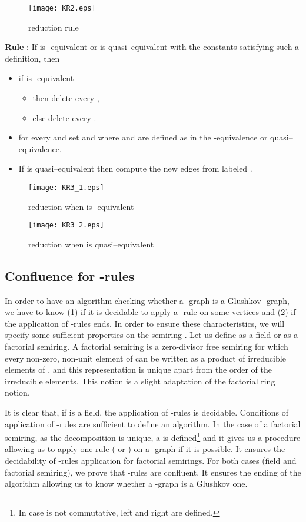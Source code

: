 \documentclass[11pt]{article}
\begin{document}
\begin{figure}[H]
\texttt{[image: KR2.eps]}
\caption{ reduction rule}\label{KR2-rule}
\end{figure}

\noindent
{\bf Rule} : If  is -equivalent or  is quasi--equivalent with   the constants satisfying such a definition,
then
\begin{itemize}
\item if  is -equivalent 
\begin{itemize}
\item then delete every ,
\item else delete every .
\end{itemize}
\item for every  and  set  and   where  and  are defined as in the -equivalence or quasi--equivalence. 
\item If  is quasi--equivalent then compute the new edges from   labeled .
\end{itemize}


\begin{figure}[H]
\texttt{[image: KR3\_1.eps]}
\caption{ reduction when  is -equivalent}\label{KR3a-rule}

\end{figure}

\begin{figure}[H]
\texttt{[image: KR3\_2.eps]}
\caption{ reduction when  is quasi--equivalent}\label{KR3b-rule}

\end{figure}

\subsection{Confluence for -rules}
In order to have an algorithm checking whether a -graph is a Glushkov -graph, we have to know (1) if it is decidable to apply a -rule on some vertices and (2) if the application of -rules ends. In order to ensure these characteristics, we will specify some sufficient properties on the semiring . Let us define  as a field or as a factorial semiring. A factorial semiring  is a zero-divisor free semiring for which every non-zero, non-unit element  of  can be written as a product of irreducible elements of  , and this representation is unique apart from the order of the irreducible elements. This notion is a slight adaptation of the factorial ring notion.

 It is clear that, if  is a field, the application of -rules is decidable. Conditions of application of -rules are sufficient to define an algorithm. In the case of a factorial semiring, as the decomposition is unique, a  is defined\footnote{In case  is not commutative, left  and right  are defined.} and it gives us a procedure  allowing us to apply one rule ( or ) on a -graph if it is possible. It ensures the decidability of -rules application for factorial semirings.  For both cases (field and factorial semiring), we prove that -rules are confluent. It ensures the ending of the algorithm allowing us to know whether a -graph is a Glushkov one. \\
\end{document}
